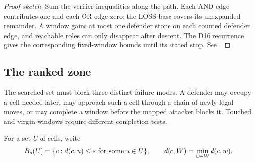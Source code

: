 \begin{proof}[Proof sketch]
Sum the verifier inequalities along the path.  Each AND edge contributes one
and each OR edge zero; the LOSS base covers its unexpanded remainder.  A
window gains at most one defender stone on each counted defender edge, and
reachable roles can only disappear after descent.  The D16 recurrence gives
the corresponding fixed-window bounds until its stated stop.  See
\cite{hexobot-companions}.
\end{proof}

\subsection{The ranked zone}

The searched set must block three distinct failure modes.  A defender may
occupy a cell needed later, may approach such a cell through a chain of newly
legal moves, or may complete a window before the mapped attacker blocks it.
Touched and virgin windows require different completion tests.

For a set $U$ of cells, write
\[
 B_s(U)=\{c:d(c,u)\le s\text{ for some }u\in U\},
 \qquad
 d(c,W)=\min_{w\in W}d(c,w).
\]

